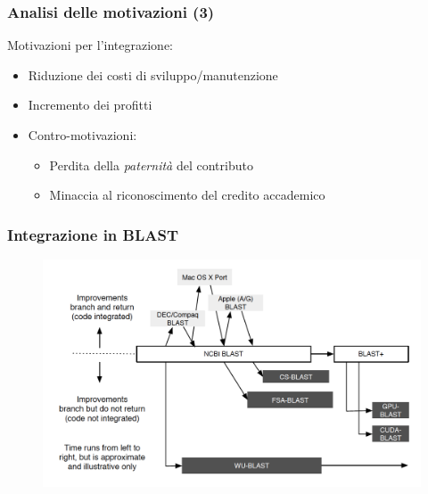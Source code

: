 \begin{frame}\frametitle{Analisi delle motivazioni (3)}

Motivazioni per l'\alert{integrazione}:

\begin{itemize}[<+->]
\itemsep1pt\parskip0pt
\item
  Riduzione dei costi di sviluppo/manutenzione
\item
  Incremento dei profitti
\item
  \alert{Contro-motivazioni:}

  \begin{itemize}[<+->]
  \itemsep1pt\parskip0pt
  \item
    Perdita della \emph{paternità} del contributo
  \item
    Minaccia al riconoscimento del credito accademico
  \end{itemize}
\end{itemize}

\end{frame}

\begin{frame}\frametitle{Integrazione in BLAST}

\begin{figure}
\begin{center}
    \includegraphics[scale=.25]{img/integration_blast}
\end{center}
\end{figure}


\end{frame}

